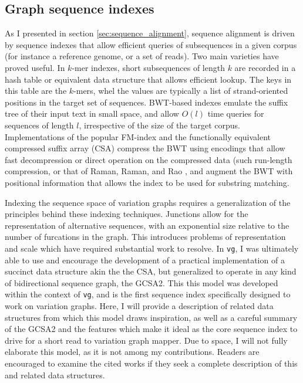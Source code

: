 \subsection{Graph sequence indexes}
\label{sec:graph_sequence_indexes}

As I presented in section \ref{sec:sequence_alignment}, sequence alignment is driven by sequence indexes that allow efficient queries of subsequences in a given corpus (for instance a reference genome, or a set of reads).
Two main varieties have proved useful.
In $k$-mer indexes, short subsequences of length $k$ are recorded in a hash table or equivalent data structure that allows efficient lookup.
The keys in this table are the $k$-mers, whel the values are typically a list of strand-oriented positions in the target set of sequences.
BWT-based indexes emulate the suffix tree of their input text in small space, and allow $O(l)$ time queries for sequences of length $l$, irrespective of the size of the target corpus.
Implementations of the popular FM-index \cite{fmindex2000,fmindex2005} and the functionally equivalent compressed suffix array (CSA) \cite{grossi2005compressed} compress the BWT using encodings that allow fast decompression or direct operation on the compressed data (such run-length compression, or that of Raman, Raman, and Rao \cite{raman2002succinct}, and augment the BWT with positional information that allows the index to be used for substring matching.

Indexing the sequence space of variation graphs requires a generalization of the principles behind these indexing techniques.
Junctions allow for the representation of alternative sequences, with an exponential size relative to the number of furcations in the graph.
This introduces problems of representation and scale which have required substantial work to resolve.
In {\tt vg}, I was ultimately able to use and encourage the development of a practical implementation of a succinct data structure akin the the CSA, but generalized to operate in any kind of bidirectional sequence graph, the GCSA2.
This this model was developed within the context of {\tt vg}, and is the first sequence index specifically designed to work on variation graphs.
Here, I will provide a description of related data structures from which this model draws inspiration, as well as a careful summary of the GCSA2 and the features which make it ideal as the core sequence index to drive for a short read to variation graph mapper.
Due to space, I will not fully elaborate this model, as it is not among my contributions.
Readers are encouraged to examine the cited works if they seek a complete description of this and related data structures.

